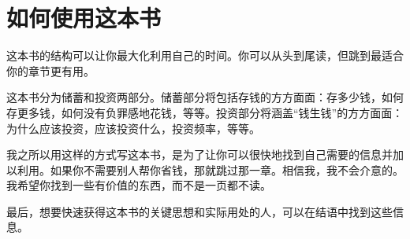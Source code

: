 \section{如何使用这本书}

这本书的结构可以让你最大化利用自己的时间。你可以从头到尾读，但跳到最适合你的章节更有用。

这本书分为储蓄和投资两部分。储蓄部分将包括存钱的方方面面：存多少钱，如何存更多钱，如何没有负罪感地花钱，等等。投资部分将涵盖“钱生钱”的方方面面：为什么应该投资，应该投资什么，投资频率，等等。

我之所以用这样的方式写这本书，是为了让你可以很快地找到自己需要的信息并加以利用。如果你不需要别人帮你省钱，那就跳过那一章。相信我，我不会介意的。我希望你找到一些有价值的东西，而不是一页都不读。

最后，想要快速获得这本书的关键思想和实际用处的人，可以在结语中找到这些信息。

